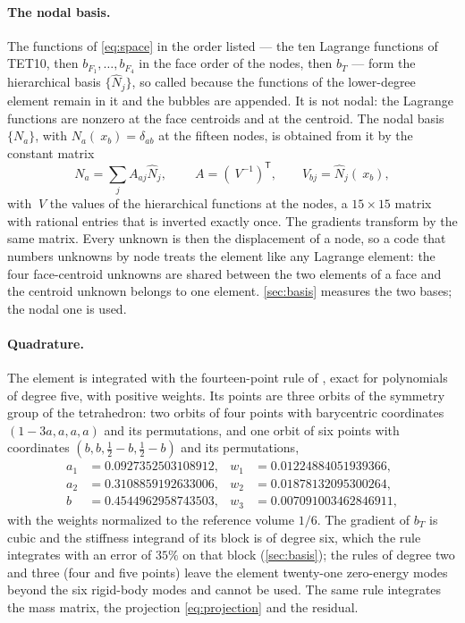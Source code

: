\documentclass{article}
\newcommand{\bx}{~x}
\newcommand{\transpose}[1]{#1^{\mathsf{T}}}
\theoremstyle{definition}
\theoremstyle{plain}
\begin{document}
\paragraph{The nodal basis.} The functions of \eqref{eq:space} in the order
listed --- the ten Lagrange functions of TET10, then $b_{F_1},
\dots, b_{F_4}$ in the face order of the nodes, then $b_T$ --- form the
hierarchical basis $\{\hat N_j\}$, so called because the functions of the
lower-degree element remain in it and the bubbles are appended. It is not
nodal: the Lagrange functions are nonzero at the face centroids and at the
centroid. The nodal basis $\{N_a\}$, with $N_a(\bx_b) = \delta_{ab}$ at the
fifteen nodes, is obtained from it by the constant matrix
\begin{equation}
  \label{eq:nodaltransform}
  N_a = \sum_j A_{aj} \hat N_j, \qquad ~A = \transpose{(~V^{-1})},
  \qquad V_{bj} = \hat N_j(\bx_b) ,
\end{equation}
with $~V$ the values of the hierarchical functions at the nodes, a $15
\times 15$ matrix with rational entries that is inverted exactly once. The
gradients transform by the same matrix. Every unknown is then the
displacement of a node, so a code that numbers unknowns by node treats the
element like any Lagrange element: the four face-centroid unknowns are
shared between the two elements of a face and the centroid unknown belongs
to one element. \cref{sec:basis} measures the two bases; the nodal one is
used.

\paragraph{Quadrature.} The element is integrated with the fourteen-point
rule of \textcite{Walkington:2000}, exact for polynomials of degree five, with
positive weights. Its points are three orbits of the symmetry group of the
tetrahedron: two orbits of four points with barycentric coordinates
$(1 - 3a, a, a, a)$ and its permutations, and one orbit of six points with
coordinates $(b, b, \tfrac12 - b, \tfrac12 - b)$ and its permutations,
\begin{equation}
  \label{eq:keast}
  \begin{aligned}
    a_1 &= 0.0927352503108912, & w_1 &= 0.01224884051939366, \\
    a_2 &= 0.3108859192633006, & w_2 &= 0.01878132095300264, \\
    b   &= 0.4544962958743503, & w_3 &= 0.007091003462846911,
  \end{aligned}
\end{equation}
with the weights normalized to the reference volume $1/6$. The gradient of
$b_T$ is cubic and the stiffness integrand of its block is of degree six,
which the rule integrates with an error of $35\%$ on that block
(\cref{sec:basis}); the rules of degree two and three (four and five
points) leave the element twenty-one zero-energy modes beyond the six
rigid-body modes and cannot be used. The same rule integrates the mass
matrix, the projection \eqref{eq:projection} and the residual.
\end{document}
